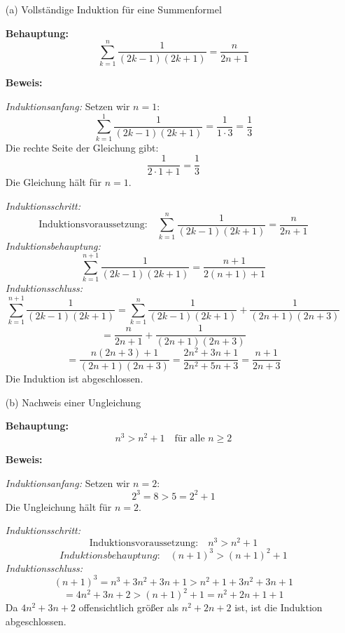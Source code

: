 \begin{enumerate}
    \item[(a)] Vollständige Induktion für eine Summenformel
    
    \textbf{Behauptung:}
    \[
    \sum_{k=1}^{n} \frac{1}{(2k-1)(2k+1)} = \frac{n}{2n+1}
    \]

    \textbf{Beweis:}

    \textit{Induktionsanfang:}
    Setzen wir \(n=1\):
    \[
    \sum_{k=1}^{1} \frac{1}{(2k-1)(2k+1)} = \frac{1}{1 \cdot 3} = \frac{1}{3}
    \]
    Die rechte Seite der Gleichung gibt:
    \[
    \frac{1}{2 \cdot 1 + 1} = \frac{1}{3}
    \]
    Die Gleichung hält für \(n=1\).

    \textit{Induktionsschritt:}
    \[
    \text{Induktionsvoraussetzung:} \quad \sum_{k=1}^{n} \frac{1}{(2k-1)(2k+1)} = \frac{n}{2n+1}
    \]
    \textit{Induktionsbehauptung:}
    \[
    \sum_{k=1}^{n+1} \frac{1}{(2k-1)(2k+1)} = \frac{n+1}{2(n+1)+1}
    \]
    \textit{Induktionsschluss:}
    \[
    \sum_{k=1}^{n+1} \frac{1}{(2k-1)(2k+1)} = \sum_{k=1}^{n} \frac{1}{(2k-1)(2k+1)} + \frac{1}{(2n+1)(2n+3)}
    \]
    \[
    = \frac{n}{2n+1} + \frac{1}{(2n+1)(2n+3)}
    \]
    \[
    = \frac{n(2n+3) + 1}{(2n+1)(2n+3)} = \frac{2n^2 + 3n + 1}{2n^2 + 5n + 3} = \frac{n+1}{2n+3}
    \]
    Die Induktion ist abgeschlossen.

    \item[(b)] Nachweis einer Ungleichung
    
    \textbf{Behauptung:}
    \[
    n^3 > n^2 + 1 \quad \text{für alle } n \geq 2
    \]

    \textbf{Beweis:}

    \textit{Induktionsanfang:}
    Setzen wir \(n=2\):
    \[
    2^3 = 8 > 5 = 2^2 + 1
    \]
    Die Ungleichung hält für \(n=2\).

    \textit{Induktionsschritt:}
    \[
    \text{Induktionsvoraussetzung:} \quad n^3 > n^2 + 1
    \]
    \[
    \textit{Induktionsbehauptung:} \quad (n+1)^3 > (n+1)^2 + 1
    \]
    \textit{Induktionsschluss:}
    \[
    (n+1)^3 = n^3 + 3n^2 + 3n + 1 > n^2 + 1 + 3n^2 + 3n + 1
    \]
    \[
    = 4n^2 + 3n + 2 > (n+1)^2 + 1 = n^2 + 2n + 1 + 1
    \]
    Da \(4n^2 + 3n + 2\) offensichtlich größer als \(n^2 + 2n + 2\) ist, ist die Induktion abgeschlossen.
\end{enumerate}